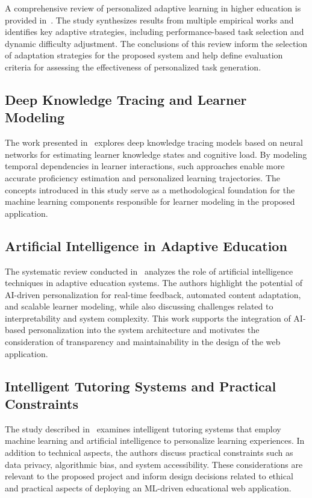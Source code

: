 \documentclass[a4paper,12pt]{extarticle}
\begin{document}
A comprehensive review of personalized adaptive learning in higher education is provided in~\cite{personalizedAdaptive2024}. The study synthesizes results from multiple empirical works and identifies key adaptive strategies, including performance-based task selection and dynamic difficulty adjustment. The conclusions of this review inform the selection of adaptation strategies for the proposed system and help define evaluation criteria for assessing the effectiveness of personalized task generation.

\subsection{Deep Knowledge Tracing and Learner Modeling}

The work presented in~\cite{deepKnowledge2025} explores deep knowledge tracing models based on neural networks for estimating learner knowledge states and cognitive load. By modeling temporal dependencies in learner interactions, such approaches enable more accurate proficiency estimation and personalized learning trajectories. The concepts introduced in this study serve as a methodological foundation for the machine learning components responsible for learner modeling in the proposed application.

\subsection{Artificial Intelligence in Adaptive Education}

The systematic review conducted in~\cite{AIadaptive2025} analyzes the role of artificial intelligence techniques in adaptive education systems. The authors highlight the potential of AI-driven personalization for real-time feedback, automated content adaptation, and scalable learner modeling, while also discussing challenges related to interpretability and system complexity. This work supports the integration of AI-based personalization into the system architecture and motivates the consideration of transparency and maintainability in the design of the web application.

\subsection{Intelligent Tutoring Systems and Practical Constraints}

The study described in~\cite{intelligentTutor2025} examines intelligent tutoring systems that employ machine learning and artificial intelligence to personalize learning experiences. In addition to technical aspects, the authors discuss practical constraints such as data privacy, algorithmic bias, and system accessibility. These considerations are relevant to the proposed project and inform design decisions related to ethical and practical aspects of deploying an ML-driven educational web application.
\end{document}
